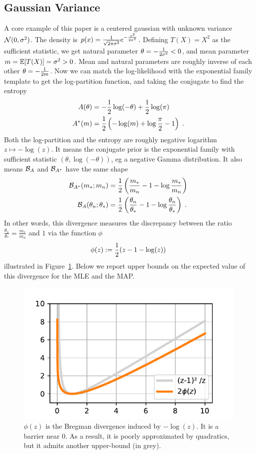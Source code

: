 \documentclass[twoside]{article}
\newcommand{\logpart}{A}
\newcommand{\conj}{\logpart^*}
\newcommand{\bregman}{\cB_\logpart}
\newcommand{\bregmanconj}{\cB_{\logpart^*}}
\newcommand{\nat}{\theta}
\newcommand{\m}{m}
\begin{document}
\subsection{Gaussian Variance}
A core example of this paper is a centered gaussian with unknown variance ${\mathcal N}(0,\sigma^2)$.
The density is	$p(x) = \frac{1}{\sqrt{2\pi \sigma^2}} e^{-\frac{x^2}{2 \sigma^2}}$.
Defining $T(X)=X^2$ as the sufficient statistic, we get natural parameter $\nat = -\inv{2 \sigma^2} <0$, and mean parameter $\m=\E[T(X)] = \sigma^2 >0$.
Mean and natural parameters are roughly inverse of each other $\nat = -\inv{2 \m}$.
Now we can match the log-likelihood with the exponential family template to get the log-partition function, and taking the conjugate to find the entropy
\begin{align}
	\logpart (\nat) &= - \half \log(-\nat)  + \half \log(\pi) \\
	\conj(\m) &= \half\left( -\log(\m) + \log\frac{\pi}{2} - 1 \right) \; .
\end{align}
Both the log-partition and  the entropy are roughly negative logarithm $z\mapsto - \log(z)$.
It means the conjugate prior is the exponential family with sufficient statistic $(\nat, \log(-\nat) )$, eg a negative Gamma distribution.
It also means $\bregman$ and $\bregmanconj$ have the same shape
\begin{align}
	\bregmanconj( \m_*; \m_n)
	&= \half \left ( \frac{\m_*}{ \m_n} - 1 - \log  \frac{\m_*}{ \m_n} \right) \\
	\bregman( \nat_n; \nat_* )
	&=  \half \left ( \frac{ \nat_n}{\nat_*} - 1 - \log  \frac{ \nat_n}{\nat_*} \right) \; .
\end{align}
In other words, this divergence measures the discrepancy between the ratio $\frac{ \nat_n}{\nat_*} =  \frac{\m_*}{ \m_n}  $ and $1$ via the function $\phi$
\begin{align}
	\phi(z) := \frac{1}{2} (z - 1 - \log(z))
\end{align}
illustrated in Figure~\ref{fig:phi}.
Below we report upper bounds on the expected value of this divergence for the MLE and the MAP.


\begin{figure}[ht]
	\centering
	\includegraphics[width=.4\textwidth]{phi.pdf}
	\caption{$\phi(z)$ is the Bregman divergence induced by $-\log(z)$. It is a barrier near $0$. As a result, it is poorly approximated by quadratics, but it admits another upper-bound (in grey).}
	\label{fig:phi}
\end{figure}
\end{document}
